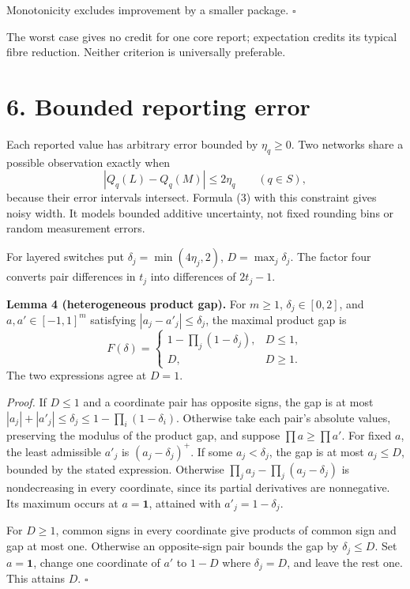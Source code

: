 \documentclass[
  british,
  11pt,
  a4paper,
]{article}
\begin{document}
Monotonicity excludes improvement by a smaller package. \(\square\)

The worst case gives no credit for one core report; expectation credits
its typical fibre reduction. Neither criterion is universally
preferable.

\section{6. Bounded reporting error}\label{bounded-reporting-error}

Each reported value has arbitrary error bounded by \(\eta_q\ge0\). Two
networks share a possible observation exactly when \[
|Q_q(L)-Q_q(M)|\le2\eta_q\qquad(q\in S),
\tag{21}
\] because their error intervals intersect. Formula (3) with this
constraint gives noisy width. It models bounded additive uncertainty,
not fixed rounding bins or random measurement errors.

For layered switches put \(\delta_j=\min(4\eta_j,2)\),
\(D=\max_j\delta_j\). The factor four converts pair differences in
\(t_j\) into differences of \(2t_j-1\).

\textbf{Lemma 4 (heterogeneous product gap).} For \(m\ge1\),
\(\delta_j\in[0,2]\), and \(a,a'\in[-1,1]^m\) satisfying
\(|a_j-a'_j|\le\delta_j\), the maximal product gap is \[
F(\delta)=
\begin{cases}
1-\prod_j(1-\delta_j),&D\le1,\\
D,&D\ge1.
\end{cases}
\tag{22}
\] The two expressions agree at \(D=1\).

\emph{Proof.} If \(D\le1\) and a coordinate pair has opposite signs, the
gap is at most \(|a_j|+|a'_j|\le\delta_j\le1-\prod_i(1-\delta_i)\).
Otherwise take each pair's absolute values, preserving the modulus of
the product gap, and suppose \(\prod a\ge\prod a'\). For fixed \(a\),
the least admissible \(a'_j\) is \((a_j-\delta_j)^+\). If some
\(a_j<\delta_j\), the gap is at most \(a_j\le D\), bounded by the stated
expression. Otherwise \(\prod_j a_j-\prod_j(a_j-\delta_j)\) is
nondecreasing in every coordinate, since its partial derivatives are
nonnegative. Its maximum occurs at \(a=\mathbf1\), attained with
\(a'_j=1-\delta_j\).

For \(D\ge1\), common signs in every coordinate give products of common
sign and gap at most one. Otherwise an opposite-sign pair bounds the gap
by \(\delta_j\le D\). Set \(a=\mathbf1\), change one coordinate of
\(a'\) to \(1-D\) where \(\delta_j=D\), and leave the rest one. This
attains \(D\). \(\square\)
\end{document}
